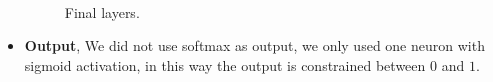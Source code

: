 \begin{itemize}
\begin{figure}[H]
		
\centering

\\



\caption{Final layers.}
\label{siameseData2}
\end{figure}


\item \textbf{Output}, We did not use softmax as output, we only used one neuron with sigmoid activation, in this way the output is constrained between $0$ and $1$.



\end{itemize}


